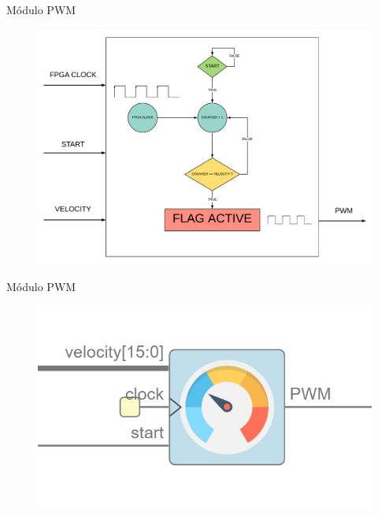\documentclass{beamer}
\begin{document}
\begin{frame}{Módulo PWM}
	\begin{figure}[H]
		\center
		\includegraphics[trim = 0mm 0mm 0mm 0mm, clip,scale=0.35]{imagenes/Balancing_robot/pwm_control.pdf}
	\end{figure}
\end{frame}

\begin{frame}{Módulo PWM}
	\begin{figure}[H]
		\center
		\includegraphics[scale=0.5]{imagenes/Balancing_robot/PWM_module.PNG}
	\end{figure}
\end{frame}
\end{document}
